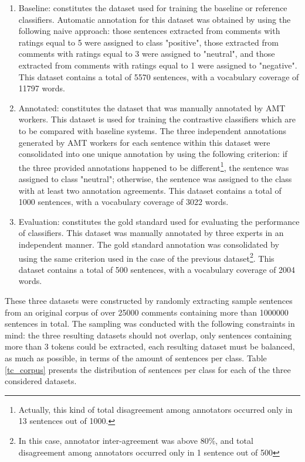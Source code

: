 \begin{enumerate}
\item Baseline: constitutes the dataset used for training the baseline or reference classifiers. 
Automatic annotation for this dataset was obtained by using the following naive approach: those sentences extracted from
comments with ratings equal to 5 were assigned to class "positive", those extracted from comments with ratings 
equal to 3 were assigned to "neutral", and those extracted from comments with ratings equal to 1 were assigned to
"negative". This dataset contains a total of 5570 sentences, with a vocabulary coverage of 11797 words. 

\item Annotated: constitutes the dataset that was manually annotated by AMT workers.
This dataset is used for training the contrastive classifiers which are to be compared with baseline systems.
The three independent annotations generated by AMT workers for each sentence within this dataset were consolidated into one unique annotation
by using the following criterion: if the three provided annotations happened to be
different\footnote{Actually, this kind of total disagreement among annotators occurred only in 13 sentences out of 1000.}, 
the sentence was assigned to class "neutral"; otherwise, the sentence was assigned to the class with
at least two annotation agreements. This dataset contains a total of 1000 sentences, with a vocabulary coverage 
of 3022 words. 

\item Evaluation: constitutes the gold standard used for evaluating the performance of classifiers.
This dataset was manually annotated by three experts in an independent manner. The gold standard annotation
was consolidated by using the same criterion used in the case of the previous dataset\footnote{In this case, 
annotator inter-agreement was above 80\%, and total disagreement among annotators occurred only in 1 sentence
out of 500}. This dataset contains a total of 500 sentences, with a vocabulary coverage of 2004 words.    
\end{enumerate} 

These three datasets were constructed by randomly extracting sample sentences from an original corpus
of over 25000 comments containing more than 1000000 sentences in total. The sampling was conducted 
with the following constraints in mind: the three resulting datasets should not overlap, only sentences 
containing more than 3 tokens could be extracted, each resulting dataset must be balanced, as much
as possible, in terms of the amount of sentences per class. Table \ref{tc_corpus} presents the
distribution of sentences per class for each of the three considered datasets.  

